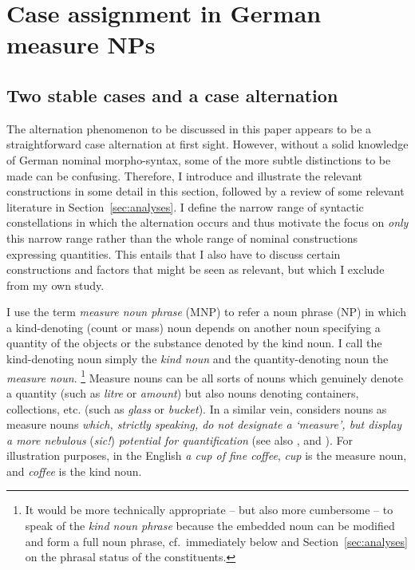 \documentclass[USenglish]{article}
\begin{document}


\section{Case assignment in German measure NPs}
\label{sec:germanmeasurenps}


\subsection{Two stable cases and a case alternation}
\label{sec:descriptive}

The alternation phenomenon to be discussed in this paper appears to be a straightforward case alternation at first sight.
However, without a solid knowledge of German nominal morpho-syntax, some of the more subtle distinctions to be made can be confusing.
Therefore, I introduce and illustrate the relevant constructions in some detail in this section, followed by a review of some relevant literature in Section~\ref{sec:analyses}.
I define the narrow range of syntactic constellations in which the alternation occurs and thus motivate the focus on \textit{only} this narrow range rather than the whole range of nominal constructions expressing quantities.
This entails that I also have to discuss certain constructions and factors that might be seen as relevant, but which I exclude from my own study.

I use the term \textit{measure noun phrase} (MNP) to refer a noun phrase (NP) in which a kind-denoting (count or mass) noun depends on another noun specifying a quantity of the objects or the substance denoted by the kind noun.
I call the kind-denoting noun simply the \textit{kind noun} and the quantity-denoting noun the \textit{measure noun}.%
\footnote{It would be more technically appropriate -- but also more cumbersome -- to speak of the \textit{kind noun phrase} because the embedded noun can be modified and form a full noun phrase, cf.\ immediately below and Section~\ref{sec:analyses} on the phrasal status of the constituents.}
Measure nouns can be all sorts of nouns which genuinely denote a quantity (such as \textit{litre} or \textit{amount}) but also nouns denoting containers, collections, etc. (such as \textit{glass} or \textit{bucket}).
In a similar vein, \citet[284]{Brems2003} considers nouns as measure nouns \textit{which, strictly speaking, do not designate a `measure', but display a more nebulous} (\textit{sic!}) \textit{potential for quantification} (see also \citealp[530]{Koptjevskaja2001}, and \citealp[338]{Rutkowski2007}).
For illustration purposes, in the English \textit{a cup of fine coffee}, \textit{cup} is the measure noun, and \textit{coffee} is the kind noun.
\end{document}
